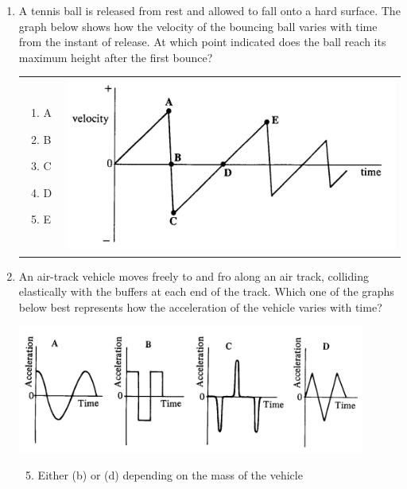 \documentclass[12pt,letterpaper]{article}
\begin{document}
\hrulefill
\vspace{-7.5pt}
\begin{enumerate}
\item
A tennis ball is released from rest and allowed to fall onto a hard surface. The graph below shows how the velocity of the bouncing ball varies with time from the instant of release. At which point indicated does the ball reach its maximum height after the first bounce?

\begin{tabular}{l r}

\begin{minipage}{0.4\textwidth}
\begin{enumerate}
\item A
\item B
\item C
\item D
\item E
\end{enumerate}
\end{minipage} &
\begin{minipage}{0.5\textwidth}
\includegraphics[width=\textwidth]{tennis.png}
\end{minipage}
\end{tabular}

\item
An air-track vehicle moves freely to and fro along an air track, colliding elastically with the buffers at each end of the track. Which one of the graphs below best represents how the acceleration of the vehicle varies with time?

\vspace{-15pt}
\includegraphics[width=0.9\textwidth]{airtrack.png}
\vspace{-20pt}
\begin{enumerate}
\setcounter{enumii}{4}
\item Either (b) or (d) depending on the mass of the vehicle
\end{enumerate}


\end{enumerate}
\end{document}
